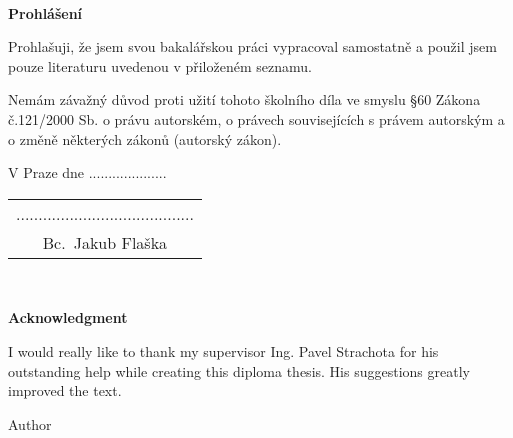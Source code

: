 \documentclass[a4paper,12pt]{report}	%
\newcommand{\autor}{Bc.~Jakub Flaška}
\begin{document}
 

\newpage


\newpage
\tableofcontents



% 

\newpage
\thispagestyle{empty}

~
\vfill %

{\bf Prohlášení}

\vspace{0.5cm} %
Prohlašuji, že jsem svou bakalářskou práci vypracoval samostatně a použil jsem pouze literaturu uvedenou v přiloženém seznamu.

Nemám závažný důvod proti užití tohoto školního díla ve smyslu \S60 Zákona č.121/2000 Sb. o právu autorském, o právech souvisejících s právem autorským a o změně některých zákonů (autorský zákon).


\vspace{5mm}V Praze dne ....................\hfill
	\begin{tabular}{c}
	........................................\\ 
	\autor
	\end{tabular}



\newpage
\thispagestyle{empty}

~
\vfill %

{\bf Acknowledgment}

\vspace{5mm} %

I would really like to thank my supervisor Ing. Pavel Strachota for his outstanding help while creating this diploma thesis. His suggestions greatly improved the text.

\begin{flushright}
Author
\end{flushright}

\vspace{5mm} %
\end{document}
